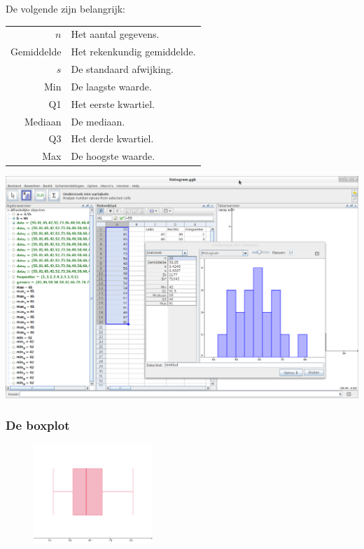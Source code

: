 \documentclass[11pt]{article}
\begin{document}
De volgende zijn belangrijk:
\begin{center}
  \begin{tabular}{r|l}
    $n$ & Het aantal gegevens.\\
    Gemiddelde & Het rekenkundig gemiddelde.\\
    $s$ & De standaard afwijking.\\
    Min & De laagste waarde.\\
    Q1 & Het eerste kwartiel.\\
    Mediaan & De mediaan.\\
    Q3 & Het derde kwartiel.\\
    Max & De hoogste waarde.\\
  \end{tabular}
\end{center}

\begin{center}
  \includegraphics[width=14cm]{gg-1var_stat}
\end{center}

\subsubsection{De boxplot}

\begin{figure}
  \vspace{-1cm}
  \includegraphics[width=0.4\textwidth]{boxplot}
\end{figure}
\end{document}
